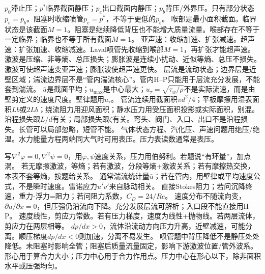 $p_0$滞止压；$p^*$临界截面静压；$p_e$出口截面内静压；$p_b$背压/外界压。只有部分状态$p_e=p_b$。阻塞时收缩喷管$p_e=p^*$，不等于更低的$p_b$。
喉部是最小面积截面。临界状态是该截面$M=1$。阻塞是继续降低背压也不能增大质量流量。喉部存在不等于一定临界；临界也不等于所有截面$M=1$。
亚声速：收缩加速、扩张减速。超声速：扩张加速、收缩减速。Laval喷管先收缩到喉部$M=1$，再扩张才能超声速。
激波是压缩、非等熵、总压损失；膨胀波是连续小扰动、近似等熵、总压不损失。激波可使超声速变亚声速；膨胀波使超声速更快。
层流是流动状态；边界层是近壁区域；湍流边界层不是“管内湍流核心”。管内H--P只能用于层流充分发展，不能套到湍流。
$\bar u$是截面平均；$u_{\max}$是中心最大；$u_\tau=\sqrt{\tau_w/\rho}$不是实际流速，而是由壁剪定义的速度尺度。壁律题用$u_\tau$。
管流连续用截面积$\pi d^2/4$；平板摩擦用湿表面积$Lb$或$2Lb$；绕流阻力用迎风面积；静水压力用受压面积投影或实际面积，别混。
沿程损失跟$L/d$有关；局部损失跟$\zeta$有关。弯头、阀门、入口、出口不是沿程损失。长管可以局部忽略，短管不能。
气体状态方程、汽化压、声速问题用绝压/绝温。水力能量方程两端同大气时可用表压。压力表读数通常是表压。

写$\nabla^2\varphi=0,\nabla^2\psi=0$，用$\varphi,\psi$速度关系，压力用伯努利。若题说“有环量”，加点涡。
若无摩擦激波，等熵；若有激波，分段等熵+激波关系；若有摩擦热交换，本表不套等熵，按题给关系。
通常湍流统计量$\bar u$；若在管内，用壁律或平均速度公式，不是瞬时速度。雷诺应力$\overline{u'v'}$来自脉动相关。
直接Stokes阻力；若问沉降终速，重力-浮力=阻力；若问阻力系数，$C_D=24/Re$。
速度分布不随流向变，$\partial u/\partial x=0$，但压强仍沿流向下降。充分发展层流可解析；入口段不能直接用H--P。
速度线性，剪应力常数。若有压力梯度，速度为线性+抛物线。若两层流体，剪应力在两层相等。
$dp/dx>0$，流体沿流动方向压力升高，近壁减速，可能分离。顺压梯度$dp/dx<0$则加速，分离不易发生。
喷管题中背压降低不是静压处处降低。未阻塞时影响全管；阻塞后质量流量固定，影响下游激波位置/管外波系。
形心用于算合力大小；压力中心用于合力作用点。压力中心在形心以下，除非面积水平或压强均匀。

